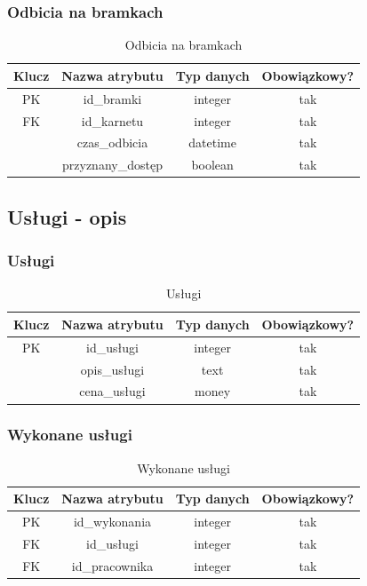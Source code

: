 \documentclass{sprawozdanie-agh}
\begin{document}
\subsubsection{Odbicia na bramkach}
\begin{table}[H]
	\centering
	\begin{tabular}{|c|c|c|c|}
		\hline
		Klucz & Nazwa atrybutu     & Typ danych & Obowiązkowy? \\ \hline
		PK    & id\_bramki         & integer    & tak           \\ \hline
		FK    & id\_karnetu        & integer    & tak           \\ \hline
		      & czas\_odbicia      & datetime   & tak           \\ \hline
		      & przyznany\_dostęp & boolean    & tak           \\ \hline
	\end{tabular}
	\caption{Odbicia na bramkach}
\end{table}

\subsection{Usługi - opis}
\subsubsection{Usługi}
\begin{table}[H]
	\centering
	\begin{tabular}{|c|c|c|c|}
		\hline
		Klucz & Nazwa atrybutu & Typ danych & Obowiązkowy? \\ \hline
		PK    & id\_usługi    & integer    & tak           \\ \hline
		      & opis\_usługi  & text       & tak           \\ \hline
		      & cena\_usługi  & money      & tak           \\ \hline
	\end{tabular}
	\caption{Usługi}
\end{table}

\subsubsection{Wykonane usługi}
\begin{table}[H]
	\centering
	\begin{tabular}{|c|c|c|c|}
		\hline
		Klucz & Nazwa atrybutu & Typ danych & Obowiązkowy? \\ \hline
		PK    & id\_wykonania  & integer    & tak           \\ \hline
		FK    & id\_usługi    & integer    & tak           \\ \hline
		FK    & id\_pracownika & integer    & tak           \\ \hline
	\end{tabular}
	\caption{Wykonane usługi}
\end{table}
\end{document}
